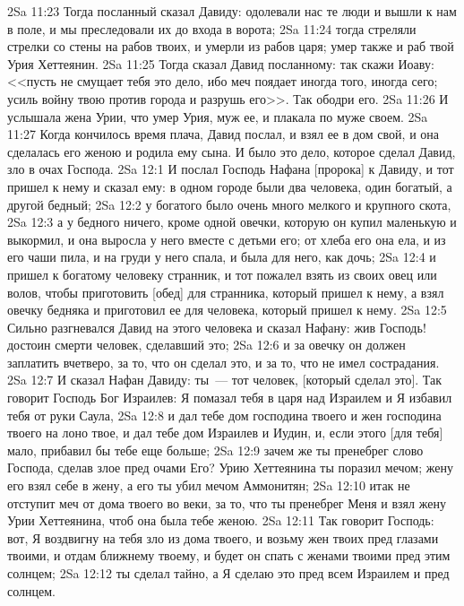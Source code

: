 \vs 2Sa 11:23 Тогда посланный сказал Давиду: одолевали нас те люди и вышли к нам в поле, и мы преследовали их до входа в ворота;
\vs 2Sa 11:24 тогда стреляли стрелки со стены на рабов твоих, и умерли  из рабов царя; умер также и раб твой Урия Хеттеянин.
\vs 2Sa 11:25 Тогда сказал Давид посланному: так скажи Иоаву: <<пусть не смущает тебя это дело, ибо меч поядает иногда того, иногда сего; усиль войну твою против города и разрушь его>>. Так ободри его.
\vs 2Sa 11:26 И услышала жена Урии, что умер Урия, муж ее, и плакала по муже своем.
\vs 2Sa 11:27 Когда кончилось время плача, Давид послал, и взял ее в дом свой, и она сделалась его женою и родила ему сына. И было это дело, которое сделал Давид, зло в очах Господа.
\vs 2Sa 12:1 И послал Господь Нафана [пророка] к Давиду, и тот пришел к нему и сказал ему: в одном городе были два человека, один богатый, а другой бедный;
\vs 2Sa 12:2 у богатого было очень много мелкого и крупного скота,
\vs 2Sa 12:3 а у бедного ничего, кроме одной овечки, которую он купил маленькую и выкормил, и она выросла у него вместе с детьми его; от хлеба его она ела, и из его чаши пила, и на груди у него спала, и была для него, как дочь;
\vs 2Sa 12:4 и пришел к богатому человеку странник, и тот пожалел взять из своих овец или волов, чтобы приготовить [обед] для странника, который пришел к нему, а взял овечку бедняка и приготовил ее для человека, который пришел к нему.
\vs 2Sa 12:5 Сильно разгневался Давид на этого человека и сказал Нафану: жив Господь! достоин смерти человек, сделавший это;
\vs 2Sa 12:6 и за овечку он должен заплатить вчетверо, за то, что он сделал это, и за то, что не имел сострадания.
\vs 2Sa 12:7 И сказал Нафан Давиду: ты~--- тот человек, [который сделал это]. Так говорит Господь Бог Израилев: Я помазал тебя в царя над Израилем и Я избавил тебя от руки Саула,
\vs 2Sa 12:8 и дал тебе дом господина твоего и жен господина твоего на лоно твое, и дал тебе дом Израилев и Иудин, и, если этого [для тебя] мало, прибавил бы тебе еще больше;
\vs 2Sa 12:9 зачем же ты пренебрег слово Господа, сделав злое пред очами Его? Урию Хеттеянина ты поразил мечом; жену его взял себе в жену, а его ты убил мечом Аммонитян;
\vs 2Sa 12:10 итак не отступит меч от дома твоего во веки, за то, что ты пренебрег Меня и взял жену Урии Хеттеянина, чтоб она была тебе женою.
\vs 2Sa 12:11 Так говорит Господь: вот, Я воздвигну на тебя зло из дома твоего, и возьму жен твоих пред глазами твоими, и отдам ближнему твоему, и будет он спать с женами твоими пред этим солнцем;
\vs 2Sa 12:12 ты сделал тайно, а Я сделаю это пред всем Израилем и пред солнцем.
